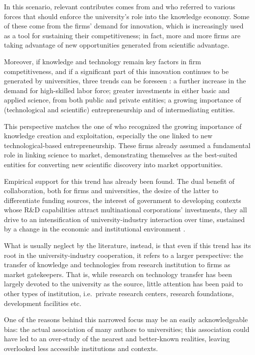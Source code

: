 In this scenario, relevant contributes comes from \citet{OShea2004} and \citet{Yusuf2008} who referred to various forces that should enforce the university's role into the knowledge economy. Some of these come from the firms' demand for innovation, which is increasingly used as a tool for sustaining their competitiveness; in fact, more and more firms are taking advantage of new opportunities generated from scientific advantage. 

Moreover, if knowledge and technology remain key factors in firm competitiveness, and if a significant part of this innovation continues to be generated by universities, three trends can be foreseen \citep{Yusuf2008}: a further increase in the demand for high-skilled labor force; greater investments in either basic and applied science, from both public and private entities; a growing importance of (technological and scientific) entrepreneurship and of intermediating entities. 

This perspective matches the one of \citet{OShea2004} who recognized the growing importance of knowledge creation and exploitation, especially the one linked to new technological-based entrepreneurship. These firms already assumed a fundamental role in linking science to market, demonstrating themselves as the best-suited entities for converting new scientific discovery into market opportunities. 

Empirical support for this trend has already been found. The dual benefit of collaboration, both for firms and universities, the desire of the latter to differentiate funding sources, the interest of government to developing contexts whose R\&D capabilities attract multinational corporations' investments, they all drive to an intensification of university-industry interaction over time, sustained by a change in the economic and institutional environment \citep{Debackere2005}.

What is usually neglect by the literature, instead, is that even if this trend has its root in the university-industry cooperation, it refers to a larger perspective: the transfer of knowledge and technologies from research institution to firms as market gatekeepers. That is, while research on technology transfer has been largely devoted to the university as the source, little attention has been paid to other types of institution, i.e.\ private research centers, research foundations, development facilities etc.

One of the reasons behind this narrowed focus may be an easily acknowledgeable bias: the actual association of many authors to universities; this association could have led to an over-study of the nearest and better-known realities, leaving overlooked less accessible institutions and contexts.

